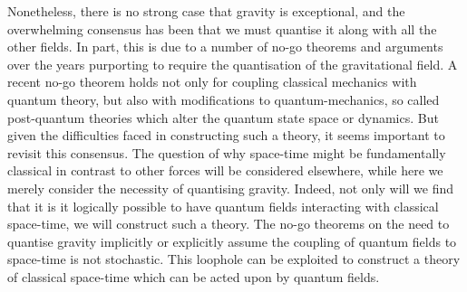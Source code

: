 \documentclass[aps,pra,showpacs,citeautoscript,amsmath,amssymb,floatfix,superscriptaddress,bbm, verbatim,amsfonts,changes,10pt,nofootinbib,longbibliography]{revtex4-1}
\begin{document}
Nonetheless, there is no strong case that gravity is exceptional, and the overwhelming consensus has been that we must quantise it along with all the other fields. In part, this is due to 
a number of no-go theorems and arguments over the years\cite{bohr1933on,cecile2011role,dewitt1962definition,
eppley1977necessity,caro1999impediments,salcedo1996absence,
sahoo2004mixing,terno2006inconsistency,salcedo2012statistical,barcelo2012hybrid,marletto2017we} purporting to require the quantisation of the gravitational field.
A recent no-go theorem\cite{marletto2017we} holds not only for coupling classical mechanics with quantum theory, but also with modifications to quantum-mechanics, so called post-quantum theories which alter the quantum state space or dynamics\cite{dynamics_foot}.
But given the difficulties faced in constructing such a theory, it seems important to revisit this consensus. The question of why space-time might be fundamentally classical in contrast to other forces will be considered elsewhere\cite{oppenheim2023rethink}, while here we merely consider the necessity of quantising gravity. Indeed, not only will we find that it is it logically possible to have quantum fields interacting with classical space-time, we will construct such a theory. The no-go theorems on the need to quantise gravity implicitly or explicitly assume the coupling of quantum fields to space-time is not stochastic. This loophole can be exploited to construct a theory of classical space-time which can be acted upon by quantum fields.
\end{document}
